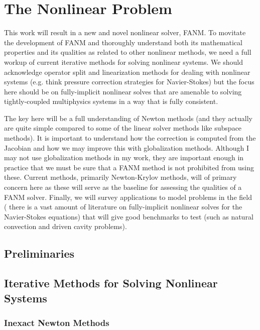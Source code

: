 \chapter{The Nonlinear Problem}
\label{ch:nonlinear_problem}

This work will result in a new and novel nonlinear solver, FANM. To
movitate the development of FANM and thoroughly understand both its
mathematical properties and its qualities as related to other
nonlinear methods, we need a full workup of current iterative methods
for solving nonlinear systems. We should acknowledge operator split
and linearization methods for dealing with nonlinear systems
(e.g. think pressure correction strategies for Navier-Stokes) but the
focus here should be on fully-implicit nonlinear solves that are
amenable to solving tightly-coupled multiphysics systems in a way that
is fully consistent.

The key here will be a full understanding of Newton methods (and they
actually are quite simple compared to some of the linear solver
methods like subspace methods). It is important to understand how the
correction is computed from the Jacobian and how we may improve this
with globalization methods. Although I may not use globalization
methods in my work, they are important enough in practice that we must
be sure that a FANM method is not prohibited from using these. Current
methods, primarily Newton-Krylov methods, will of primary concern here
as these will serve as the baseline for assessing the qualities of a
FANM solver. Finally, we will survey applications to model problems in
the field ( there is a vast amount of literature on fully-implicit
nonlinear solves for the Navier-Stokes equations) that will give good
benchmarks to test (such as natural convection and driven cavity
problems).

\section{Preliminaries}
\label{sec:nonlinear_preliminaries}

\section{Iterative Methods for Solving Nonlinear Systems}
\label{sec:nonlinear_methods}

\subsection{Inexact Newton Methods}
\label{subsec:newton_methods}

